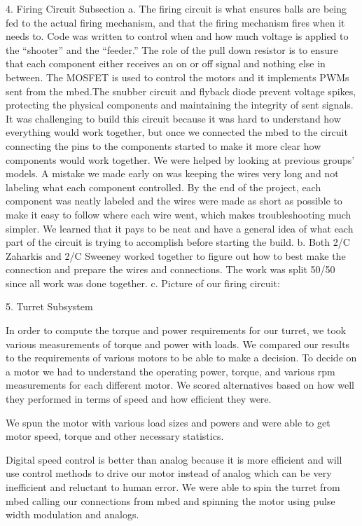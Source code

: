 {    4. Firing Circuit Subsection
        a. The firing circuit is what ensures balls are being fed to the actual firing mechanism, and that the firing mechanism fires when it needs to. Code was written to control when and how much voltage is applied to the “shooter” and the “feeder.” The role of the pull down resistor is to ensure that each component either receives an on or off signal and nothing else in between. The MOSFET is used to control the motors and it implements PWMs sent from the mbed.The snubber circuit and flyback diode prevent voltage spikes, protecting the physical components and maintaining the integrity of sent signals. It was challenging to build this circuit because it was hard to understand how everything would work together, but once we connected the mbed to the circuit connecting the pins to the components started to make it more clear how components would work together. We were helped by looking at previous groups’ models. A mistake we made early on was keeping the wires very long and not labeling what each component controlled. By the end of the project, each component was neatly labeled and the wires were made as short as possible to make it easy to follow where each wire went, which makes troubleshooting much simpler. We learned that it pays to be neat and have a general idea of what each part of the circuit is trying to accomplish before starting the build.
        b. Both 2/C Zaharkis and 2/C Sweeney worked together to figure out how to best make the connection and prepare the wires and connections. The work was split 50/50 since all work was done together.
        c. Picture of our firing circuit:
		
    5. Turret Subsystem

In order to compute the torque and power requirements for our turret, we took various measurements of torque and power with loads. We compared our results to the requirements of various motors to be able to make a decision. To decide on a motor we had to understand the operating power, torque, and various rpm measurements for each different motor. We scored alternatives based on how well they performed in terms of speed and how efficient they were.

We spun the motor with various load sizes and powers and were able to get motor speed, torque and other necessary statistics.

Digital speed control is better than analog because it is more efficient and will use control methods to drive our motor instead of analog which can be very inefficient and reluctant to human error. We were able to spin the turret from mbed calling our connections from mbed and spinning the motor using pulse width modulation and analogs. 

}

